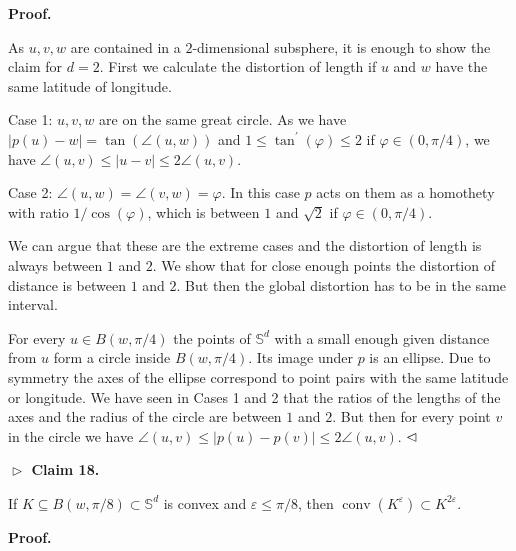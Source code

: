\par\medskip\noindent\textbf{Proof.}\par
As $u,v,w$ are contained in a $2$-dimensional subsphere, it is enough to show the claim for $d=2$. First we calculate the distortion of length if $u$ and $w$ have the same latitude of longitude.
\par
\par
Case 1: $u,v,w$ are on the same great circle. As we have $|p(u)-w|=\tan(\angle(u,w))$ and $1\leq\tan^{\prime}(\varphi)\leq 2$ if $\varphi\in(0,\pi/4)$, we have $\angle(u,v)\leq|u-v|\leq 2\angle(u,v)$.
\par
\par
Case 2: $\angle(u,w)=\angle(v,w)=\varphi$. In this case $p$ acts on them as a homothety with ratio $1/\cos(\varphi)$, which is between $1$ and $\sqrt{2}$ if $\varphi\in(0,\pi/4)$.
\par
\par
We can argue that these are the extreme cases and the distortion of length is always between $1$ and $2$. We show that for close enough points the distortion of distance is between $1$ and $2$. But then the global distortion has to be in the same interval.
\par
\par
For every $u\in B(w,\pi/4)$ the points of $\mathbb{S}^{d}$ with a small enough given distance from $u$ form a circle inside $B(w,\pi/4)$. Its image under $p$ is an ellipse. Due to symmetry the axes of the ellipse correspond to point pairs with the same latitude or longitude. We have seen in Cases 1 and 2 that the ratios of the lengths of the axes and the radius of the circle are between $1$ and $2$. But then for every point $v$ in the circle we have $\angle(u,v)\leq|p(u)-p(v)|\leq 2\angle(u,v)$. $\hfill\vartriangleleft$
\par
\par
\par\medskip\noindent\textbf{$\vartriangleright$ Claim 18.}\par
If $K\subseteq B(w,\pi/8)\subset\mathbb{S}^{d}$ is convex and $\varepsilon\leq\pi/8$, then $\operatorname{conv}(K^{\varepsilon})\subset K^{2\varepsilon}$.
\par
\par
\par
\par
\par\medskip\noindent\textbf{Proof.}\par
